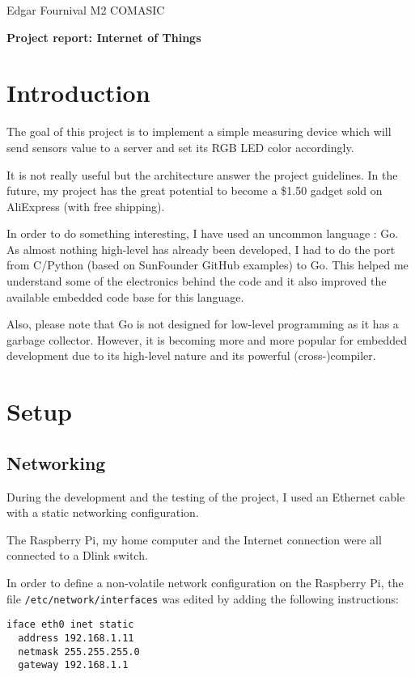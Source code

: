 \documentclass[11pt,a4paper]{article}
\newcommand{\rpi}{Raspberry Pi\xspace}
\begin{document}
Edgar Fournival \hfill M2 COMASIC

\begin{center}
  \medskip
  \huge\textbf{Project report: Internet of Things}
  \medskip
\end{center}

\section*{Introduction}
The goal of this project is to implement a simple measuring device which will send sensors value to a server and set its RGB LED color accordingly.

It is not really useful but the architecture answer the project guidelines. In the future, my project has the great potential to become a \$1.50 gadget sold on AliExpress (with free shipping).

In order to do something interesting, I have used an uncommon language : Go. As almost nothing high-level has already been developed, I had to do the port from C/Python (based on SunFounder GitHub examples) to Go. This helped me understand some of the electronics behind the code and it also improved the available embedded code base for this language.

Also, please note that Go is not designed for low-level programming as it has a garbage collector. However, it is becoming more and more popular for embedded development due to its high-level nature and its powerful (cross-)compiler.

\section{Setup}

\subsection{Networking}
During the development and the testing of the project, I used an Ethernet cable with a static networking configuration.

The \rpi, my home computer and the Internet connection were all connected to a Dlink switch.

In order to define a non-volatile network configuration on the \rpi, the file \texttt{/etc/network/\allowbreak interfaces} was edited by adding the following instructions:
\begin{verbatim}
iface eth0 inet static
  address 192.168.1.11
  netmask 255.255.255.0
  gateway 192.168.1.1
\end{verbatim}
\end{document}
